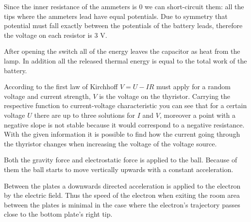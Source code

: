 \documentclass[11pt]{article}
\begin{document}

\hinteng
Since the inner resistance of the ammeters is 0 we can short-circuit them: all the tips where the ammeters lead have equal potentials. Due to symmetry that potential must fall exactly between the potentials of the battery leads, therefore the voltage on each resistor is 3 V.
\probend
\bigskip


\hinteng
After opening the switch all of the energy leaves the capacitor as heat from the lamp. In addition all the released thermal energy is equal to the total work of the battery.
\probend
\bigskip


\hinteng
According to the first law of Kirchhoff $V = U - IR$ must apply for a random voltage and current strength, $V$ is the voltage on the thyristor. Carrying the respective function to current-voltage characteristic you can see that for a certain voltage $U$ there are up to three solutions for $I$ and $V$, moreover a point with a negative slope is not stable because it would correspond to a negative resistance. With the given information it is possible to find how the current going through the thyristor changes when increasing the voltage of the voltage source.
\probend
\bigskip


\hinteng
Both the gravity force and electrostatic force is applied to the ball. Because of them the ball starts to move vertically upwards with a constant acceleration.
\probend
\bigskip


\hinteng
Between the plates a downwards directed acceleration is applied to the electron by the electric field. Thus the speed of the electron when exiting the room area between the plates is minimal in the case where the electron's trajectory passes close to the bottom plate's right tip.
\probend
\bigskip
\end{document}
